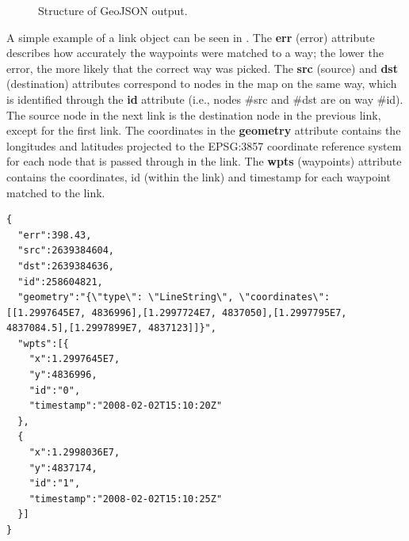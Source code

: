 \begin{figure}[H]
	\centering
	\caption{Structure of GeoJSON output.}
	\label{fig:geojson}
\end{figure}

A simple example of a link object can be seen in . The \textbf{err} (error) attribute describes how accurately the waypoints were matched to a way; the lower the error, the more likely that the correct way was picked. The \textbf{src} (source) and \textbf{dst} (destination) attributes correspond to nodes in the map on the same way, which is identified through the \textbf{id} attribute (i.e., nodes \#src and \#dst are on way \#id). The source node in the next link is the destination node in the previous link, except for the first link. The coordinates in the \textbf{geometry} attribute contains the longitudes and latitudes projected to the EPSG:3857 coordinate reference system for each node that is passed through in the link. The \textbf{wpts} (waypoints) attribute contains the coordinates, id (within the link) and timestamp for each waypoint matched to the link. 

\begin{lstlisting}[style=java, caption=Content of a simple link object., label=lst:geojson:link]
{
  "err":398.43,
  "src":2639384604,
  "dst":2639384636,
  "id":258604821,
  "geometry":"{\"type\": \"LineString\", \"coordinates\": [[1.2997645E7, 4836996],[1.2997724E7, 4837050],[1.2997795E7, 4837084.5],[1.2997899E7, 4837123]]}",
  "wpts":[{
    "x":1.2997645E7,
    "y":4836996,
    "id":"0",
    "timestamp":"2008-02-02T15:10:20Z"
  },
  {
    "x":1.2998036E7,
    "y":4837174,
    "id":"1",
    "timestamp":"2008-02-02T15:10:25Z"
  }]
}
\end{lstlisting}
